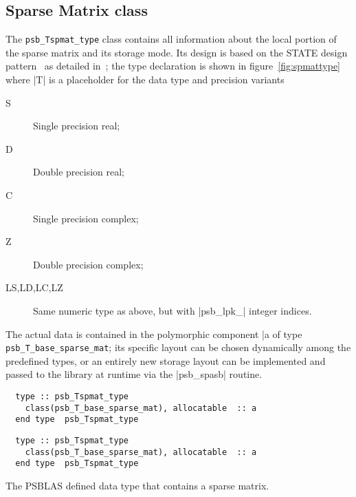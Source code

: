\subsection{Sparse Matrix class}
\label{sec:spmat}
The \hypertarget{spdata}{{\tt psb\_Tspmat\_type}} class
contains all information about the local portion of the sparse matrix and   
its storage mode. Its design is 
based on the STATE design pattern~\cite{DesignPatterns} as detailed
in~\cite{Sparse03}; the type declaration is shown in
figure~\ref{fig:spmattype} where \fortinline|T| is a placeholder for the
data type and precision variants 
\begin{description}
\item[S] Single precision real;
\item[D] Double precision real;
\item[C] Single precision complex;
\item[Z] Double precision complex;
\item[LS,LD,LC,LZ] Same numeric type as above, but with
  \fortinline|psb_lpk_| integer indices.
\end{description}
The actual data is contained in the polymorphic component \fortinline|a%
of type  \hypertarget{spbasedata}{{\tt psb\_T\_base\_sparse\_mat}}; its
specific layout can be chosen dynamically among the predefined types,
or an entirely new storage layout can be implemented and passed to the
library at runtime via the \fortinline|psb_spasb| routine. 
\begin{listing}[h!]
\ifpdf
\begin{verbatim}
  type :: psb_Tspmat_type
    class(psb_T_base_sparse_mat), allocatable  :: a 
  end type  psb_Tspmat_type
\end{verbatim}
\else
\begin{center}
    \begin{minipage}[tl]{0.85\textwidth}
\begin{verbatim}
  type :: psb_Tspmat_type
    class(psb_T_base_sparse_mat), allocatable  :: a 
  end type  psb_Tspmat_type
\end{verbatim}
    \end{minipage}
  \end{center}
\fi
  \caption{\label{fig:spmattype} 
    The PSBLAS defined data type that
    contains a sparse matrix.} 
\end{listing}
